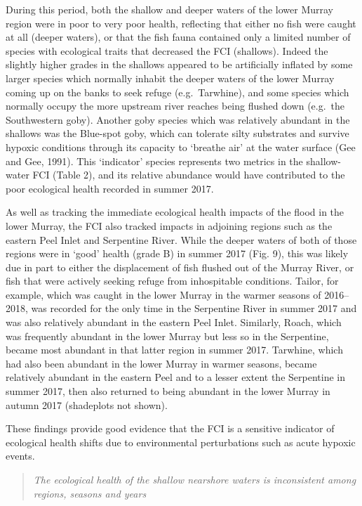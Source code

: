 \documentclass[
]{book}
\begin{document}
During this period, both the shallow and deeper waters of the lower Murray region were in poor to very poor health, reflecting that either no fish were caught at all (deeper waters), or that the fish fauna contained only a limited number of species with ecological traits that decreased the FCI (shallows). Indeed the slightly higher grades in the shallows appeared to be artificially inflated by some larger species which normally inhabit the deeper waters of the lower Murray coming up on the banks to seek refuge (e.g.~Tarwhine), and some species which normally occupy the more upstream river reaches being flushed down (e.g.~the Southwestern goby). Another goby species which was relatively abundant in the shallows was the Blue-spot goby, which can tolerate silty substrates and survive hypoxic conditions through its capacity to `breathe air' at the water surface (Gee and Gee, 1991). This `indicator' species represents two metrics in the shallow-water FCI (Table 2), and its relative abundance would have contributed to the poor ecological health recorded in summer 2017.

As well as tracking the immediate ecological health impacts of the flood in the lower Murray, the FCI also tracked impacts in adjoining regions such as the eastern Peel Inlet and Serpentine River. While the deeper waters of both of those regions were in `good' health (grade B) in summer 2017 (Fig. 9), this was likely due in part to either the displacement of fish flushed out of the Murray River, or fish that were actively seeking refuge from inhospitable conditions. Tailor, for example, which was caught in the lower Murray in the warmer seasons of 2016--2018, was recorded for the only time in the Serpentine River in summer 2017 and was also relatively abundant in the eastern Peel Inlet. Similarly, Roach, which was frequently abundant in the lower Murray but less so in the Serpentine, became most abundant in that latter region in summer 2017. Tarwhine, which had also been abundant in the lower Murray in warmer seasons, became relatively abundant in the eastern Peel and to a lesser extent the Serpentine in summer 2017, then also returned to being abundant in the lower Murray in autumn 2017 (shadeplots not shown).

These findings provide good evidence that the FCI is a sensitive indicator of ecological health shifts due to environmental perturbations such as acute hypoxic events.

\begin{quote}
\emph{The ecological health of the shallow nearshore waters is inconsistent among regions, seasons and years}
\end{quote}
\end{document}
